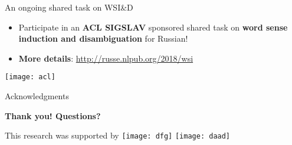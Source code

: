 \begin{frame}{An ongoing shared task on WSI\&D}
  
  \begin{itemize}
  \item Participate in an \textbf{\alert{ACL SIGSLAV}} sponsored shared task on \textbf{word sense induction and disambiguation} for Russian!
 \end{itemize} 
  
%  
  \begin{itemize}
    \item \textbf{More details}: \url{http://russe.nlpub.org/2018/wsi}
     
  \end{itemize}
  
  \begin{center}
  	\texttt{[image: acl]}
  \end{center}
\end{frame}

\begin{frame}{Acknowledgments}

{\Huge \textbf{Thank you! \alert{Questions?}}}

\vspace{2em}

{\normalsize This research was supported by}
\texttt{[image: dfg]} \texttt{[image: daad]}

\end{frame}


